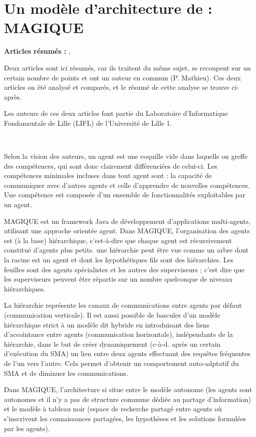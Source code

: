 \section{Un modèle d'architecture de  : MAGIQUE}
\textbf{Articles résumés :} \cite{m1}, \cite{m2}

Deux articles sont ici résumés, car ils traitent du même sujet, se recoupent sur un certain nombre de points et ont un auteur en commun (P. Mathieu). Ces deux articles on été analysé et comparés, et le résumé de cette analyse se trouve ci-après.



Les auteurs de ces deux articles font partie du Laboratoire d'Informatique Fondamentale de Lille (LIFL) de l'Université de Lille 1.

~

Selon la vision des auteurs, un agent est une \og{}coquille vide\fg{} dans laquelle on greffe des compétences, qui sont donc clairement différenciées de celui-ci. Les compétences minimales incluses dans tout agent sont : la capacité de communiquer avec d'autres agents et celle d'apprendre de nouvelles compétences. Une compétence est composée d'un ensemble de fonctionnalités exploitables par un agent.

MAGIQUE est un framework Java de développement d'applications multi-agents, utilisant une approche \og{}orientée agent\fg{}. Dans MAGIQUE, l'organisation des agents est (à la base) hiérarchique, c'est-à-dire que chaque agent est récursivement constitué d'agents plus petits. une hiérarchie peut être vue comme un arbre dont la racine est un agent et dont les hypothétiques fils sont des hiérarchies. Les feuilles sont des agents spécialistes et les autres des superviseurs ; c'est dire que les superviseurs peuvent être répartis sur un nombre quelconque de niveaux hiérarchiques.

La hiérarchie représente les canaux de communications entre agents par défaut (communication verticale). Il est aussi possible de basculer d'un modèle hiérarchique strict à un modèle dit \og{}hybride\fg{} en introduisant des liens d'\og{}accointance\fg{} entre agents (communication horizontale), indépendants de la hiérarchie, dans le but de créer dynamiquement (c-à-d. après un certain d'exécution du SMA) un lien entre deux agents effectuant des requêtes fréquentes de l'un vers l'autre. Cela permet d'obtenir un comportement auto-adptatif du SMA et de diminuer les communications.

Dans MAGIQUE, l'architecture si situe entre le modèle autonome (les agents sont autonomes et il n'y a pas de structure commune dédiée au partage d'information) et le modèle à tableau noir (espace de recherche partagé entre agents où s'inscrivent les connaissances partagées, les hypothèses et les solutions formulées par les agents).


